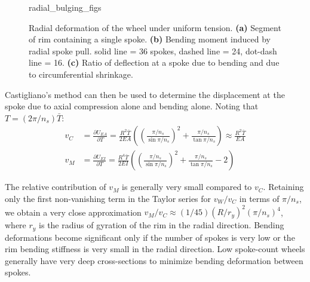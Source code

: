 \documentclass[\rootdir/thesis.tex]{subfiles}
\begin{document}
\begin{figure}
\centering
{radial_bulging_figs}
\caption{Radial deformation of the wheel under uniform tension. \textbf{(a)} Segment of rim containing a single spoke. \textbf{(b)} Bending moment induced by radial spoke pull. solid line = 36 spokes, dashed line = 24, dot-dash line = 16. \textbf{(c)} Ratio of deflection at a spoke due to bending and due to circumferential shrinkage.}
\label{fig:radial_bulging}
\end{figure}

Castigliano's method can then be used to determine the displacement at the spoke due to axial compression alone and bending alone. Noting that $T = (2\pi/n_s)\bar{T}$:
\begin{align}
v_C &= \frac{\partial U_{EA}}{\partial T} = \frac{R^2\bar{T}}{2EA} \left( \left(\frac{\pi/n_s}{\sin{\pi/n_s}}\right)^2 +
    \frac{\pi/n_s}{\tan{\pi/n_s}}\right)
    \approx \frac{R^2\bar{T}}{EA}\label{eq:vC}\\
v_M &= \frac{\partial U_{EI}}{\partial T} = \frac{R^4\bar{T}}{2EI} \left( \left(\frac{\pi/n_s}{\sin{\pi/n_s}}\right)^2 +
    \frac{\pi/n_s}{\tan{\pi/n_s}} - 2\right)\label{eq:vM}
\end{align}

The relative contribution of $v_M$ is generally very small compared to $v_C$. Retaining only the first non-vanishing term in the Taylor series for $v_W/v_C$ in terms of $\pi/n_s$, we obtain a very close approximation $v_M/v_C\approx(1/45)(R/r_y)^2(\pi/n_s)^4$, where $r_y$ is the radius of gyration of the rim in the radial direction. Bending deformations become significant only if the number of spokes is very low or the rim bending stiffness is very small in the radial direction. Low spoke-count wheels generally have very deep cross-sections to minimize bending deformation between spokes.
\end{document}
